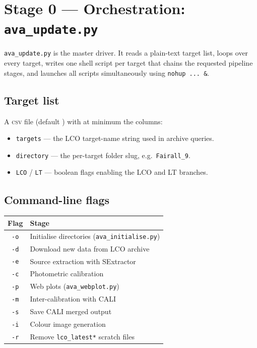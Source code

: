 \documentclass[12pt,a4paper]{article}
\begin{document}
\section{Stage 0 --- Orchestration: \texorpdfstring{\texttt{ava\_update.py}}{ava_update.py}}
\label{sec:orchestrator}

\texttt{ava\_update.py} is the master driver.  It reads a plain-text target list, loops over
every target, writes one shell script per target that chains the requested pipeline stages,
and launches all scripts simultaneously using \texttt{nohup ... \&}.

\subsection{Target list}

A \textsc{csv} file (default ) with at minimum the columns:
\begin{itemize}[noitemsep]
  \item \texttt{targets} --- the LCO target-name string used in archive queries.
  \item \texttt{directory} --- the per-target folder slug, e.g.\ \texttt{Fairall\_9}.
  \item \texttt{LCO} / \texttt{LT} --- boolean flags enabling the LCO and LT branches.
\end{itemize}

\subsection{Command-line flags}

\begin{center}
\begin{tabular}{cl}
\toprule
Flag & Stage \\
\midrule
\texttt{-o} & Initialise directories (\texttt{ava\_\hspace{0pt}initialise.py}) \\
\texttt{-d} & Download new data from LCO archive \\
\texttt{-e} & Source extraction with SExtractor \\
\texttt{-c} & Photometric calibration \\
\texttt{-p} & Web plots (\texttt{ava\_webplot.py}) \\
\texttt{-m} & Inter-calibration with CALI \\
\texttt{-s} & Save CALI merged output \\
\texttt{-i} & Colour image generation \\
\texttt{-r} & Remove \texttt{lco\_latest*} scratch files \\
\bottomrule
\end{tabular}
\end{center}
\end{document}
